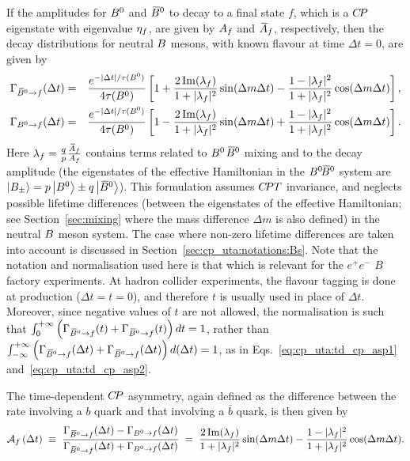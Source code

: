 If the amplitudes for $B^0$ and $\kern 0.18em\overline{\kern -0.18em B}{}^0$ to decay to a final state $f$, 
which is a $C\!P$ eigenstate with eigenvalue ${\eta_f}$,
are given by $A_f$ and $\kern 0.18em\overline{\kern -0.18em A}{}_f$, respectively, 
then the decay distributions for neutral $B$ mesons, 
with known flavour at time $\Delta t =0$,
are given by
\begin{eqnarray}
  \label{eq:cp_uta:td_cp_asp1}
  \Gamma_{\kern 0.18em\overline{\kern -0.18em B}{}^0 \to f} (\Delta t) & = &
  \frac{e^{-| \Delta t | / \tau(B^0)}}{4\tau(B^0)}
  \left[ 
    1 +
    \frac{2\, {\rm Im}(\lambda_f)}{1 + |\lambda_f|^2} \sin(\Delta m \Delta t) -
    \frac{1 - |\lambda_f|^2}{1 + |\lambda_f|^2} \cos(\Delta m \Delta t)
  \right], \\
  \label{eq:cp_uta:td_cp_asp2}
  \Gamma_{B^0 \to f} (\Delta t) & = &
  \frac{e^{-| \Delta t | / \tau(B^0)}}{4\tau(B^0)}
  \left[ 
    1 -
    \frac{2\, {\rm Im}(\lambda_f)}{1 + |\lambda_f|^2} \sin(\Delta m \Delta t) +
    \frac{1 - |\lambda_f|^2}{1 + |\lambda_f|^2} \cos(\Delta m \Delta t)
  \right].
\end{eqnarray}
Here $\lambda_f = \frac{q}{p} \frac{\kern 0.18em\overline{\kern -0.18em A}{}_f}{A_f}$ 
contains terms related to $B^0$\textendash$\kern 0.18em\overline{\kern -0.18em B}{}^0$ mixing and to the decay amplitude
(the eigenstates of the effective Hamiltonian in the $\BzBzb$ system 
are $\left| B_\pm \right> = p \left| B^0 \right> \pm q \left| \kern 0.18em\overline{\kern -0.18em B}{}^0 \right>$).
This formulation assumes $C\!PT$ invariance, 
and neglects possible lifetime differences 
(between the eigenstates of the effective Hamiltonian;
see Section~\ref{sec:mixing} where the mass difference $\Delta m$ is also defined)
in the neutral $B$ meson system.
The case where non-zero lifetime differences are taken into account is 
discussed in Section~\ref{sec:cp_uta:notations:Bs}.
Note that the notation and normalisation used here is that which is relevant for the $e^+e^-$ $B$ factory experiments.
At hadron collider experiments, the flavour tagging is done at production ($\Delta t = t = 0$), and therefore $t$ is usually used in place of $\Delta t$.
Moreover, since negative values of $t$ are not allowed, the normalisation is such that 
$\int_0^{+\infty} \left( 
\Gamma_{\kern 0.18em\overline{\kern -0.18em B}{}^0 \to f} (t) + \Gamma_{\kern 0.18em\overline{\kern -0.18em B}{}^0 \to f} (t) \right) dt = 1$,
rather than 
$\int_{-\infty}^{+\infty} \left( 
\Gamma_{\kern 0.18em\overline{\kern -0.18em B}{}^0 \to f} (\Delta t) + \Gamma_{\kern 0.18em\overline{\kern -0.18em B}{}^0 \to f} (\Delta t) \right) d(\Delta t) = 1$,
as in Eqs.~\ref{eq:cp_uta:td_cp_asp1} and~\ref{eq:cp_uta:td_cp_asp2}.

The time-dependent $C\!P$ asymmetry,
again defined as the difference between the rate 
involving a $b$ quark and that involving a $\bar b$ quark,
is then given by
\begin{equation}
  \label{eq:cp_uta:td_cp_asp}
  {\cal A}_{f} \left(\Delta t\right) \; \equiv \;
  \frac{
    \Gamma_{\kern 0.18em\overline{\kern -0.18em B}{}^0 \to f} (\Delta t) - \Gamma_{B^0 \to f} (\Delta t)
  }{
    \Gamma_{\kern 0.18em\overline{\kern -0.18em B}{}^0 \to f} (\Delta t) + \Gamma_{B^0 \to f} (\Delta t)
  } \; = \;
  \frac{2\, {\rm Im}(\lambda_f)}{1 + |\lambda_f|^2} \sin(\Delta m \Delta t) -
  \frac{1 - |\lambda_f|^2}{1 + |\lambda_f|^2} \cos(\Delta m \Delta t).
\end{equation}

